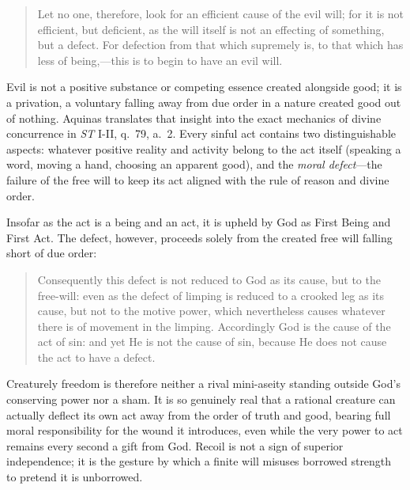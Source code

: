 \begin{quote}
Let no one, therefore, look for an efficient cause of the evil will; for it is not efficient, but deficient, as the will itself is not an effecting of something, but a defect. For defection from that which supremely is, to that which has less of being,---this is to begin to have an evil will.
\end{quote}

Evil is not a positive substance or competing essence created alongside good; it is a privation, a voluntary falling away from due order in a nature created good out of nothing. Aquinas translates that insight into the exact mechanics of divine concurrence in \emph{ST} I-II, q.\ 79, a.\ 2. Every sinful act contains two distinguishable aspects: whatever positive reality and activity belong to the act itself (speaking a word, moving a hand, choosing an apparent good), and the \emph{moral defect}---the failure of the free will to keep its act aligned with the rule of reason and divine order.

Insofar as the act is a being and an act, it is upheld by God as First Being and First Act. The defect, however, proceeds solely from the created free will falling short of due order:

\begin{quote}
Consequently this defect is not reduced to God as its cause, but to the free-will: even as the defect of limping is reduced to a crooked leg as its cause, but not to the motive power, which nevertheless causes whatever there is of movement in the limping. Accordingly God is the cause of the act of sin: and yet He is not the cause of sin, because He does not cause the act to have a defect.
\end{quote}

Creaturely freedom is therefore neither a rival mini-aseity standing outside God's conserving power nor a sham. It is so genuinely real that a rational creature can actually deflect its own act away from the order of truth and good, bearing full moral responsibility for the wound it introduces, even while the very power to act remains every second a gift from God. Recoil is not a sign of superior independence; it is the gesture by which a finite will misuses borrowed strength to pretend it is unborrowed.

